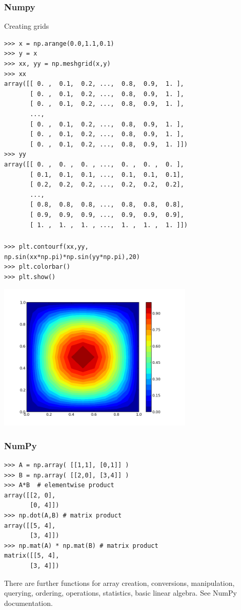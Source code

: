 \begin{frame}[fragile]
\frametitle{Numpy}
Creating grids
\begin{myColorBox}{0.9}{}
\begin{verbatim}
>>> x = np.arange(0.0,1.1,0.1)
>>> y = x
>>> xx, yy = np.meshgrid(x,y)
>>> xx
array([[ 0. ,  0.1,  0.2, ...,  0.8,  0.9,  1. ],
       [ 0. ,  0.1,  0.2, ...,  0.8,  0.9,  1. ],
       [ 0. ,  0.1,  0.2, ...,  0.8,  0.9,  1. ],
       ..., 
       [ 0. ,  0.1,  0.2, ...,  0.8,  0.9,  1. ],
       [ 0. ,  0.1,  0.2, ...,  0.8,  0.9,  1. ],
       [ 0. ,  0.1,  0.2, ...,  0.8,  0.9,  1. ]])
>>> yy
array([[ 0. ,  0. ,  0. , ...,  0. ,  0. ,  0. ],
       [ 0.1,  0.1,  0.1, ...,  0.1,  0.1,  0.1],
       [ 0.2,  0.2,  0.2, ...,  0.2,  0.2,  0.2],
       ..., 
       [ 0.8,  0.8,  0.8, ...,  0.8,  0.8,  0.8],
       [ 0.9,  0.9,  0.9, ...,  0.9,  0.9,  0.9],
       [ 1. ,  1. ,  1. , ...,  1. ,  1. ,  1. ]])
\end{verbatim}
\end{myColorBox}
\end{frame}

\begin{frame}[fragile]
\frametitle{}
\begin{myColorBox}{0.9}{}
\begin{verbatim}
>>> plt.contourf(xx,yy,
np.sin(xx*np.pi)*np.sin(yy*np.pi),20)
>>> plt.colorbar()
>>> plt.show()
\end{verbatim}
\end{myColorBox}
\pause
\begin{center}
      \includegraphics[width=0.7\textwidth]{pix/mesh_example_1}
\end{center}
\end{frame}

\begin{frame}[fragile]
    \frametitle{NumPy}
    \begin{myColorBox}{0.9}{}
\begin{verbatim}
>>> A = np.array( [[1,1], [0,1]] )
>>> B = np.array( [[2,0], [3,4]] )
>>> A*B  # elementwise product
array([[2, 0], 
       [0, 4]])
>>> np.dot(A,B) # matrix product
array([[5, 4],
       [3, 4]])
>>> np.mat(A) * np.mat(B) # matrix product
matrix([[5, 4],
       [3, 4]])
\end{verbatim}
    \end{myColorBox}
There are further functions for array creation, conversions, manipulation, querying, ordering, operations, statistics, basic linear algebra. See NumPy documentation.
\end{frame}

